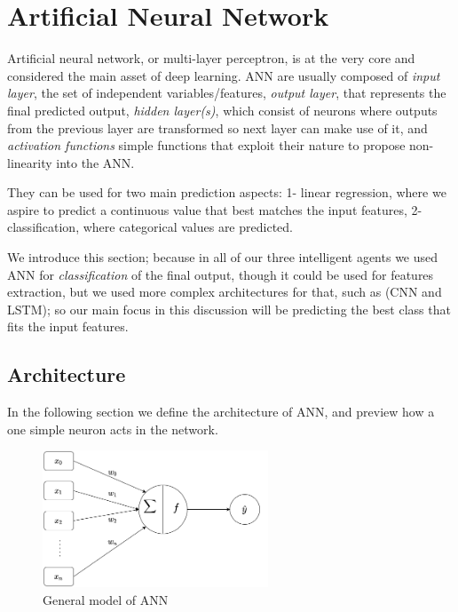 \pagebreak

\section{Artificial Neural Network}
\label{Artificial Neural Network}
Artificial neural network, or multi-layer perceptron, is at the very core and considered the main asset of deep learning. ANN are usually composed of \textit{input layer}, the set of independent variables/features, \textit{output layer}, that represents the final predicted output, \textit{hidden layer(s)}, which consist of neurons where outputs from the previous layer are transformed so next layer can make use of it, and \textit{activation functions} simple functions that exploit their nature to propose non-linearity into the ANN.

They can be used for two main prediction aspects: 1- linear regression, where we aspire to predict a continuous value that best matches the input features, 2- classification, where categorical values are predicted.

We introduce this section; because in all of our three intelligent agents we used ANN for \textit{classification} of the final output, though it could be used for features extraction, but we used more complex architectures for that, such as (CNN and LSTM); so our main focus in this discussion will be predicting the best class that fits the input features.


\subsection{Architecture}
In the following section we define the architecture of ANN, and preview how a one simple neuron acts in the network.

\begin{figure}[h]
\centering
\includegraphics[width=0.6\textwidth]{images/ann_1.png}
\caption{General model of ANN}
\label{General model of ANN}
\end{figure}

